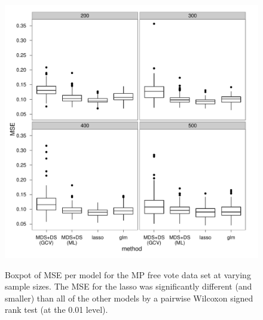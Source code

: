 \begin{figure}
\centering
\includegraphics[width=6in]{gds/figs/mp-mse.pdf} \\
\caption{Boxpot of MSE per model for the MP free vote data set at varying sample sizes. The MSE for the lasso was significantly different (and smaller) than all of the other models by a pairwise Wilcoxon signed rank test (at the 0.01 level).}
\label{gds-mps-mse}
\end{figure}

